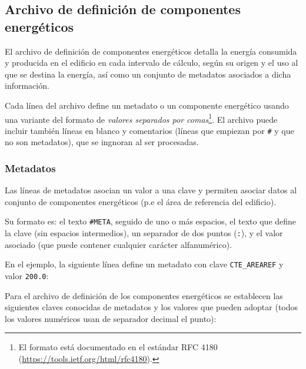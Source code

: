 \documentclass[10pt,notitlepage,oneside,a4paper]{article}
\begin{document}
\subsection{Archivo de definición de componentes energéticos}\label{sec:formatocomponentes}

El archivo de definición de componentes energéticos detalla la energía consumida y producida en el edificio en cada intervalo de cálculo, según su origen y el uso al que se destina la energía, así como un conjunto de metadatos asociados a dicha información.

Cada línea del archivo define un metadato o un componente energético usando una variante del formato de \textit{valores separados por comas}\footnote{El formato está documentado en el estándar RFC 4180 (\url{https://tools.ietf.org/html/rfc4180}).}. El archivo puede incluir también líneas en blanco y comentarios (líneas que empiezan por \texttt{\#} y que no son metadatos), que se ingnoran al ser procesadas.



\subsubsection{Metadatos}

Las líneas de metadatos asocian un valor a una clave y permiten asociar datos al conjunto de componentes energéticos (p.e el área de referencia del edificio).

Su formato es: el texto \texttt{\#META}, seguido de uno o más espacios, el texto que define la clave (sin espacios intermedios), un separador de dos puntos (\texttt{:}), y el valor asociado (que puede contener cualquier carácter alfanumérico).

En el ejemplo, la siguiente línea define un metadato con clave \texttt{CTE\_AREAREF} y valor \texttt{200.0}:



Para el archivo de definición de los componentes energéticos se establecen las siguientes claves conocidas de metadatos y los valores que pueden adoptar (todos los valores numéricos usan de separador decimal el punto):
\end{document}
